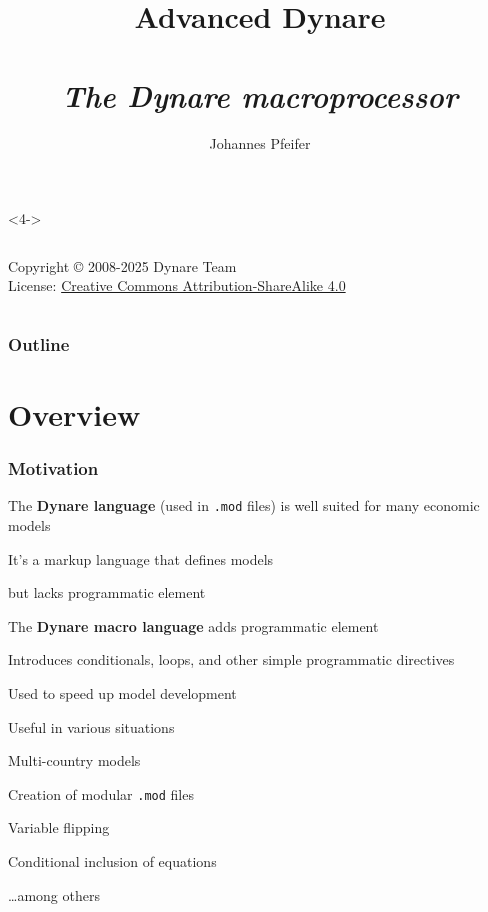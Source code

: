 \documentclass[handout,usepdftitle=false,xcolor=dvipsnames,aspectratio=169]{beamer}
\title[]{\textbf{Advanced Dynare\\}
\medskip{Chapter III}\\
\emph{The Dynare macroprocessor}
}
\author{Johannes Pfeifer}
\begin{document}
\begin{frame}<4->
  \titlepage
  \begin{columns}[T]

    \ccbysa
    \tiny
    Copyright © 2008-2025 Dynare Team \\
    License: \href{http://creativecommons.org/licenses/by-sa/4.0/}{Creative
      Commons Attribution-ShareAlike 4.0}
  \end{columns}
\end{frame}

\begin{frame}
  \frametitle{Outline}
  \tableofcontents
\end{frame}

\section{Overview}

\begin{frame}
  \frametitle{Motivation}
  \begin{witemize}
    \item The \textbf{Dynare language} (used in \texttt{.mod} files) is well suited for many economic models
    \begin{witemize}
      \item It's a markup language that defines models
      \item but lacks programmatic element
    \end{witemize}
    \item The \textbf{Dynare macro language} adds programmatic element
    \begin{witemize}
      \item Introduces conditionals, loops, and other simple programmatic directives
      \item Used to speed up model development
      \item Useful in various situations
      \begin{witemize}
        \item Multi-country models
        \item Creation of modular \texttt{.mod} files
        \item Variable flipping
        \item Conditional inclusion of equations
        \item \ldots among others
      \end{witemize}
    \end{witemize}
  \end{witemize}
\end{frame}
\end{document}

